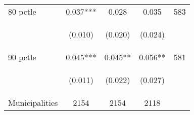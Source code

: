 \begin{tabular}{lcccc}
80 pctle   &  0.037***    &   0.028    &     0.035  &  583  \\

\vspace{4pt} &  \begin{footnotesize}(0.010)\end{footnotesize}   &
			    \begin{footnotesize}(0.020)\end{footnotesize}   &
			    \begin{footnotesize}(0.024)\end{footnotesize}   &
			     \\          



90 pctle  &  0.045***    &   0.045**    &     0.056**  &  581  \\

\vspace{4pt} &  \begin{footnotesize}(0.011)\end{footnotesize}   &
			    \begin{footnotesize}(0.022)\end{footnotesize}   &
			    \begin{footnotesize}(0.027)\end{footnotesize}   &
			     \\          

Municipalities   &   2154   &    2154     &  2118    \\
\hline	


\end{tabular}%
